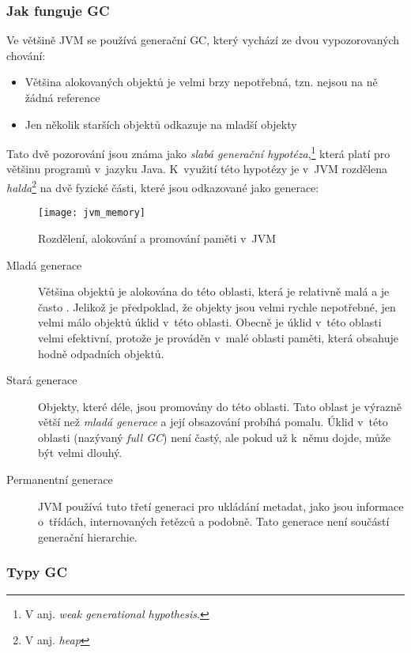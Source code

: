 \subsubsection{Jak funguje GC}
Ve většině JVM se používá generační GC, který vychází ze dvou vypozorovaných chování:
\begin{itemize}
  \item Většina alokovaných objektů je velmi brzy nepotřebná, tzn. nejsou na ně žádná reference
  \item Jen několik starších objektů odkazuje na mladší objekty
\end{itemize}
Tato dvě pozorování jsou známa jako \emph{slabá generační hypotéza}\cite{hunt2011java},\footnote{V anj. \emph{weak generational hypothesis}.} která platí pro většinu programů v~jazyku Java.
K~využití této hypotézy je v~JVM rozdělena \emph{halda}\footnote{V anj. \emph{heap}} na dvě fyzické části, které jsou odkazované jako generace:

\begin{figure}[h]
\centering
\texttt{[image: jvm\_memory]}
\caption{Rozdělení, alokování a promování paměti v~JVM}
\label{fig:jvm_memory}
\end{figure}

\begin{description}
  \item[Mladá generace] Většina objektů je alokována do této oblasti, která je relativně malá a je často .
Jelikož je předpoklad, že objekty jsou velmi rychle nepotřebné, jen velmi málo objektů  úklid v~této oblasti.
Obecně je úklid v~této oblasti velmi efektivní, protože je prováděn v~malé oblasti paměti, která obsahuje hodně odpadních objektů.

  \item[Stará generace] Objekty, které  déle, jsou promovány do této oblasti.
Tato oblast je výrazně větší než \emph{mladá generace} a její obsazování probíhá pomalu.
Úklid v~této oblasti (nazývaný \emph{full GC}) není častý, ale pokud už k~němu dojde, může být velmi dlouhý.

  \item[Permanentní generace] JVM používá tuto třetí generaci pro ukládání metadat, jako jsou informace o~třídách, internovaných řetězců a podobně.
Tato generace není součástí generační hierarchie.

\end{description}

\subsubsection{Typy GC\label{subsub:gctypes}}

